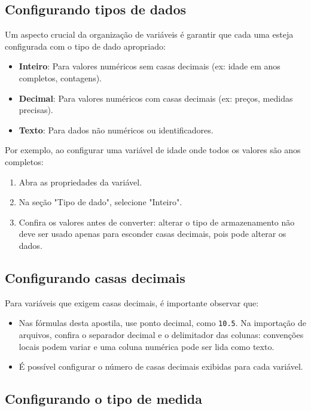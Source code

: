 \subsection{Configurando tipos de dados}

Um aspecto crucial da organização de variáveis é garantir que cada uma esteja configurada com o tipo de dado apropriado:

\begin{itemize}
    \item \textbf{Inteiro}: Para valores numéricos sem casas decimais (ex: idade em anos completos, contagens).
    \item \textbf{Decimal}: Para valores numéricos com casas decimais (ex: preços, medidas precisas).
    \item \textbf{Texto}: Para dados não numéricos ou identificadores.
\end{itemize}

Por exemplo, ao configurar uma variável de idade onde todos os valores são anos completos:

\begin{enumerate}
    \item Abra as propriedades da variável.
    \item Na seção "Tipo de dado", selecione "Inteiro".
    \item Confira os valores antes de converter: alterar o tipo de armazenamento não deve ser usado apenas para esconder casas decimais, pois pode alterar os dados.
\end{enumerate}

\subsection{Configurando casas decimais}

Para variáveis que exigem casas decimais, é importante observar que:

\begin{itemize}
    \item Nas fórmulas desta apostila, use ponto decimal, como \texttt{10.5}. Na importação de arquivos, confira o separador decimal e o delimitador das colunas: convenções locais podem variar e uma coluna numérica pode ser lida como texto.
    \item É possível configurar o número de casas decimais exibidas para cada variável.
\end{itemize}

\subsection{Configurando o tipo de medida}

